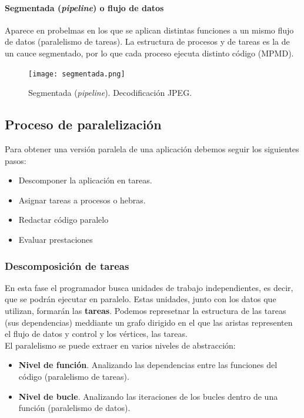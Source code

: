\documentclass[12pt,spanish]{article}
\begin{document}
\paragraph{Segmentada (\textit{pipeline}) o flujo de datos}

Aparece en probelmas en los que se aplican distintas funciones a un mismo flujo de datos (paralelismo de tareas). La estructura de procesos y de tareas es la de un cauce segmentado, por lo que cada proceso ejecuta distinto código (MPMD).

\begin{figure}[H]
	\centering
	\texttt{[image: segmentada.png]}
	\caption{Segmentada (\textit{pipeline}). Decodificación JPEG.}
\end{figure}


\subsection{Proceso de paralelización}
Para obtener una versión paralela de una aplicación debemos seguir los siguientes pasos:
\begin{itemize}
	\item Descomponer la aplicación en tareas.
	\item Asignar tareas a procesos o hebras.
	\item Redactar código paralelo
	\item Evaluar prestaciones
\end{itemize}
\subsubsection{Descomposición de tareas}

En esta fase el programador busca unidades de trabajo independientes, es decir, que se podrán ejecutar en paralelo. Estas unidades, junto con los datos que utilizan, formarán las \textbf{tareas}. Podemos represetnar la estructura de las tareas (sus dependencias) meddiante un grafo dirigido en el que las aristas representen el flujo de datos y control y los vértices, las tareas.\\

El paralelismo se puede extraer en varios niveles de abstracción:
\begin{itemize}
	\item \textbf{Nivel de función}. Analizando las dependencias entre las funciones del código (paralelismo de tareas).
	\item \textbf{Nivel de bucle}. Analizando las iteraciones de los bucles dentro de una función (paralelismo de datos).
\end{itemize}
\end{document}
